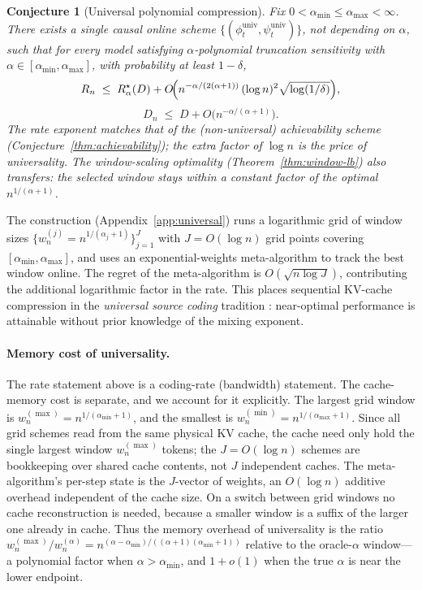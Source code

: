 \documentclass[11pt]{article}
\theoremstyle{plain}
\newtheorem{conjecture}[theorem]{Conjecture}
\theoremstyle{definition}
\theoremstyle{remark}
\begin{document}
\begin{conjecture}[Universal polynomial compression]\label{thm:universal}
Fix $0 < \alpha_{\min} \leq \alpha_{\max} < \infty$. There exists a
single causal online scheme
$\{(\phi_t^{\mathrm{univ}}, \psi_t^{\mathrm{univ}})\}$, not depending
on $\alpha$, such that for \emph{every} model satisfying
$\alpha$-polynomial truncation sensitivity with
$\alpha \in [\alpha_{\min}, \alpha_{\max}]$, with probability at
least $1-\delta$,
\[
R_n \;\leq\; R^\star_\alpha(D)
   + O\!\Bigl(n^{-\alpha/(2(\alpha+1))}\,(\log n)^2
              \sqrt{\log(1/\delta)}\Bigr),
\]
\[
D_n \;\leq\; D + O\!\bigl(n^{-\alpha/(\alpha+1)}\bigr).
\]
The rate exponent matches that of the (non-universal) achievability
scheme (Conjecture~\ref{thm:achievability}); the extra factor of
$\log n$ is the price of universality. The window-scaling
optimality (Theorem~\ref{thm:window-lb}) also transfers: the
selected window stays within a constant factor of the optimal
$n^{1/(\alpha+1)}$.
\end{conjecture}

The construction (Appendix~\ref{app:universal}) runs a logarithmic
grid of window sizes $\{w_n^{(j)} = n^{1/(\alpha_j + 1)}\}_{j=1}^{J}$
with $J = O(\log n)$ grid points covering
$[\alpha_{\min}, \alpha_{\max}]$, and uses an exponential-weights
meta-algorithm \citep{cesabianchi2006prediction} to track the
best window online. The regret of the meta-algorithm is
$O(\sqrt{n \log J})$, contributing the additional logarithmic
factor in the rate. This places sequential KV-cache compression in
the \emph{universal source coding} tradition
\citep{rissanen1984universal,mahmood2024minimax}: near-optimal
performance is attainable without prior knowledge of the mixing
exponent.

\paragraph{Memory cost of universality.}
The rate statement above is a coding-rate (bandwidth) statement.
The cache-memory cost is separate, and we account for it explicitly. The largest grid window is
$w_n^{(\max)} = n^{1/(\alpha_{\min}+1)}$, and the smallest is
$w_n^{(\min)} = n^{1/(\alpha_{\max}+1)}$. Since all grid schemes
read from the same physical KV cache, the cache need only hold the
single largest window $w_n^{(\max)}$ tokens; the $J = O(\log n)$
schemes are bookkeeping over shared cache contents, not $J$
independent caches. The meta-algorithm's per-step state is the
$J$-vector of weights, an $O(\log n)$ additive overhead independent
of the cache size. On a switch between grid windows no cache
reconstruction is needed, because a smaller window is a suffix of
the larger one already in cache. Thus the memory overhead of
universality is the ratio
$w_n^{(\max)}/w_n^{(\alpha)} = n^{(\alpha-\alpha_{\min})/
((\alpha+1)(\alpha_{\min}+1))}$ relative to the oracle-$\alpha$
window---a polynomial factor when $\alpha > \alpha_{\min}$, and
$1+o(1)$ when the true $\alpha$ is near the lower endpoint.
\end{document}
